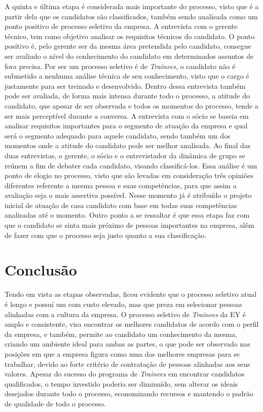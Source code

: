 A quinta e última etapa é considerada mais importante do processo, visto que é a partir dela que os candidatos são classificados, também sendo analisada como um ponto positivo de processo seletivo da empresa.
A entrevista com o gerente técnico, tem como objetivo analisar os requisitos técnicos do candidato. O ponto positivo é, pelo gerente ser da mesma área pretendida pelo candidato, consegue ser avaliado o nível do conhecimento do candidato em determinados assuntos de fora precisa. Por ser um processo seletivo é de \textit{Trainees}, o candidato não é submetido a nenhuma análise técnica de seu conhecimento, visto que o cargo é justamente para ser treinado e desenvolvido. Dentro dessa entrevista também pode ser avaliada, de forma mais intensa durante todo o processo, a atitude do candidato, que apesar de ser observada e todos os momentos do processo, tende a ser mais perceptível durante a conversa.
A entrevista com o sócio se baseia em analisar requisitos importantes para o segmento de atuação da empresa e qual será o segmento adequado para aquele candidato, sendo também um dos momentos onde a atitude do candidato pode ser melhor analisada.
Ao final das duas entrevistas, o gerente, o sócio e o entrevistador da dinâmica de grupo se reúnem a fim de debater cada candidato, visando classificá-los. Essa análise é um ponto de elogio no processo, visto que são levadas em consideração três opiniões diferentes referente a mesma pessoa e suas competências, para que assim a avaliação seja o mais assertiva possível. Nesse momento já é atribuído o projeto inicial de atuação de casa candidato com base em todas suas competências analisadas até o momento. Outro ponto a se ressaltar é que essa etapa faz com que o candidato se sinta mais próximo de pessoas importantes na empresa, além de fazer com que o processo seja justo quanto a sua classificação.





\chapter[Conclusão]{Conclusão}

Tendo em vista as etapas observadas, ficou evidente que o processo seletivo atual é longo e possuí um com custo elevado, mas que preza em selecionar pessoas alinhadas com a cultura da empresa.
O processo seletivo de \textit{Trainees} da EY é amplo e consistente, visa encontrar os melhores candidatos de acordo com o perfil da empresa, e também, permite ao candidato um conhecimento da mesma, criando um ambiente ideal para ambas as partes, o que pode ser observado nas posições em que a empresa figura como uma das melhores empresas para se trabalhar, devido ao forte critério de contratação de pessoas alinhadas aos seus valores.
Apesar do sucesso do programa de \textit{Trainees} em encontrar candidatos qualificados, o tempo investido poderia ser diminuído, sem alterar os ideais desejados durante todo o processo, economizando recursos e mantendo o padrão de qualidade de todo o processo.

